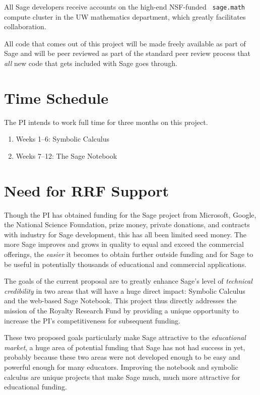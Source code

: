\documentclass[11pt]{article}
\begin{document}
All Sage developers receive accounts on the high-end NSF-funded {\tt
  sage.math} compute cluster in the UW mathematics department, which
greatly facilitates collaboration.

All code that comes out of this project will be made freely available
as part of Sage and will be peer reviewed as part of the standard peer
review process that {\em all} new code that gets included with Sage
goes through.

\section{Time Schedule}

The PI intends to work full time for three months on this project.

\begin{enumerate}
\item Weeks 1--6: Symbolic Calculus
\item Weeks 7--12: The Sage Notebook
\end{enumerate}


\section{Need for RRF Support}


Though the PI has obtained funding for the Sage project from
Microsoft, Google, the National Science Foundation, prize money,
private donations, and contracts with industry for Sage development,
this has all been limited seed money.  The more Sage improves and
grows in quality to equal and exceed the commercial offerings, the
{\em easier} it becomes to obtain further outside funding and for Sage
to be useful in potentially thousands of educational and commercial
applications.

The goals of the current proposal are to greatly enhance Sage's level
of {\em technical credibility} in two areas that will have a huge
direct impact: Symbolic Calculus and the web-based Sage Notebook.
This project thus directly addresses the mission of the Royalty
Research Fund by providing a unique opportunity to increase the PI's
competitiveness for subsequent funding.

These two proposed goals particularly make Sage attractive to the {\em
  educational market}, a huge area of potential funding that Sage has
not had success in yet, probably because these two areas were not
developed enough to be easy and powerful enough for many educators.
Improving the notebook and symbolic calculus are unique projects that
make Sage much, much more attractive for educational funding.
\end{document}
